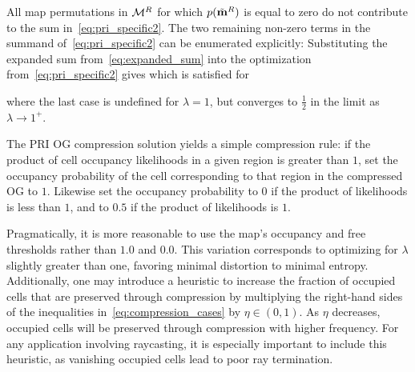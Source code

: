 All map permutations in $\mathcal{M}^{R}$ for which $p(\tilde{\mathbf{m}}^{R})$ is equal
to zero do not contribute to the sum in~\eqref{eq:pri_specific2}. The two
remaining non-zero terms in the summand of~\eqref{eq:pri_specific2} can be
enumerated explicitly:
%
%
Substituting the expanded sum from~\eqref{eq:expanded_sum} into the optimization
from~\eqref{eq:pri_specific2}
gives
%
which is satisfied for
%

where the last case is undefined for $\lambda=1$, but converges
to $\frac{1}{2}$ in the limit as $\lambda \rightarrow 1^{+}$.

The PRI OG compression solution yields a simple compression rule:
if the product of cell occupancy likelihoods in a given region is
greater than $1$, set the occupancy probability of the cell corresponding to
that region in the compressed OG to $1$. Likewise set the occupancy probability to $0$
if the product of likelihoods is less than $1$, and to $0.5$ if the
product of likelihoods is $1$.

Pragmatically, it is more reasonable to
use the map's occupancy and free thresholds rather than $1.0$ and $0.0$.
This variation corresponds to optimizing for $\lambda$ slightly greater
than one, favoring minimal distortion to minimal entropy. Additionally,
one may introduce a heuristic to increase the fraction of occupied cells
that are preserved through compression by multiplying the right-hand
sides of the inequalities in~\eqref{eq:compression_cases} by
$\eta \in (0, 1)$. As $\eta$ decreases, occupied cells will be preserved
through compression with higher frequency. For any application involving
raycasting, it is especially important to include this heuristic, as
vanishing occupied cells lead to poor ray termination.

